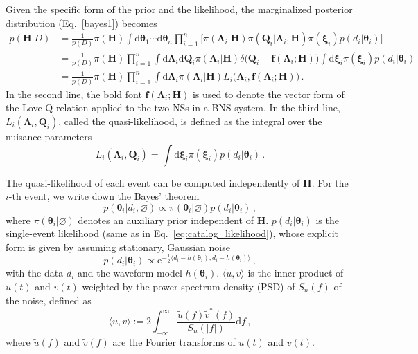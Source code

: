 \documentclass[a4paper,11pt]{article}
\begin{document}
Given the specific form of the prior and the likelihood, the marginalized posterior distribution (Eq.~\eqref{bayes1}) becomes
\begin{equation}
\label{hierarchical bayes}
\begin{aligned}
p(\bm{H}|D)&=\frac{1}{p(D)}\pi(\bm{H})\int \text{d}\bm{\theta}_1\cdots\text{d}\bm{\theta}_n \prod_{i=1}^n \big[\pi(\bm{\Lambda}_i|\bm{H})\pi(\bm{Q}_i|\bm{\Lambda}_i,\bm{H})\pi(\bm{\xi}_i)p(d_i|\bm{\theta}_i)\big] \\
&=\frac{1}{p(D)} \pi(\bm{H}) \prod_{i=1}^n
\int \text{d}\bm{\Lambda}_i\text{d}\bm{Q}_i\pi(\bm{\Lambda}_i|\bm{H})\delta\big(\bm{Q}_i-\bm{f}(\bm{\Lambda}_i;\bm{H})\big) \int \text{d}\bm{\xi}_i \pi(\bm{\xi}_i)p(d_i|\bm{\theta}_i)\\
&=\frac{1}{p(D)} \pi(\bm{H}) \prod_{i=1}^n
\int \text{d}\bm{\Lambda}_i\pi(\bm{\Lambda}_i|\bm{H})L_i\big(\bm{\Lambda}_i,\bm{f}(\bm{\Lambda}_i;\bm{H})\big)\,.
\end{aligned}
\end{equation}
In the second line, the bold font $\bm{f}(\bm{\Lambda}_i;\bm{H})$ is used to denote the vector form
of the Love-Q relation applied to the two NSs in a BNS system. In the third line,
$L_i(\bm{\Lambda}_i,\bm{Q}_i)$, called the quasi-likelihood,
 is defined as the integral over the nuisance
parameters
\begin{equation}
\label{quasi-likelihood}
    L_i(\bm{\Lambda}_i,\bm{Q}_i)=\int \text{d}\bm{\xi}_i \pi(\bm{\xi}_i)p(d_i|\bm{\theta}_i)\,.
\end{equation}

The quasi-likelihood of each event can be 
computed independently of $\bm{H}$. For the $i\text{-th}$ event, we write down
the Bayes' theorem
\begin{equation}
\label{single bayes}
    p(\bm{\theta}_i|d_i, \varnothing)\propto \pi(\bm{\theta}_i|\varnothing)p(d_i|\bm{\theta}_i)\,,
\end{equation}
where $\pi(\bm{\theta}_i|\varnothing)$ denotes an auxiliary prior 
independent of $\bm{H}$. $p(d_i|\bm{\theta}_i)$ is the single-event
likelihood (same as in Eq.~\eqref{eq:catalog_likelihood}), whose explicit form is
 given by assuming stationary, Gaussian noise~\cite{Finn:1992wt}
\begin{equation}
p(d_i|\bm{\theta}_i)\propto \mathrm{e}^{-\frac{1}{2}\langle d_i-h(\bm{\theta}_i),d_i-h(\bm{\theta}_i)\rangle}\,,
\end{equation}
with the data $d_i$ and the waveform model $h(\bm{\theta}_i)$. $\langle u, v\rangle$ 
is the inner product of $u(t)$ and $v(t)$ weighted by the power spectrum density
(PSD) of $S_n(f)$ of the noise, defined as
\begin{equation}
    \langle u, v\rangle:= 2\int_{-\infty}^{\infty}\frac{\tilde{u}(f)\tilde{v}^{*}(f)}{S_n(|f|)} \text{d}f\,,
\end{equation}
where $\tilde{u}(f)$ and $\tilde{v}(f)$ are the Fourier transforms of $u(t)$ and $v(t)$.
\end{document}
